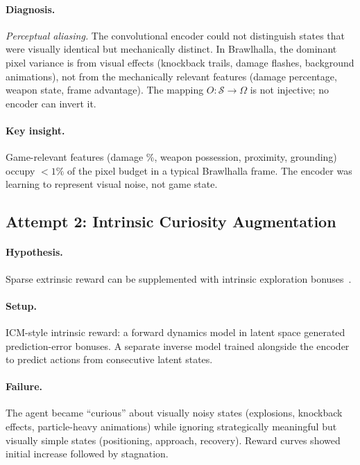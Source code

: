 \documentclass[11pt,a4paper]{article}
\begin{document}
\paragraph{Diagnosis.}
\emph{Perceptual aliasing.}
The convolutional encoder could not distinguish states that were visually identical but mechanically distinct.
In Brawlhalla, the dominant pixel variance is from visual effects (knockback trails, damage flashes, background animations), not from the mechanically relevant features (damage percentage, weapon state, frame advantage).
The mapping $O: \mathcal{S} \to \Omega$ is not injective; no encoder can invert it.

\paragraph{Key insight.}
Game-relevant features (damage \%, weapon possession, proximity, grounding) occupy $<1\%$ of the pixel budget in a typical Brawlhalla frame.
The encoder was learning to represent visual noise, not game state.

\subsection{Attempt 2: Intrinsic Curiosity Augmentation}
\label{sec:curiosity-failure}

\paragraph{Hypothesis.}
Sparse extrinsic reward can be supplemented with intrinsic exploration bonuses~\cite{pathak2017curiosity}.

\paragraph{Setup.}
ICM-style intrinsic reward: a forward dynamics model in latent space generated prediction-error bonuses.
A separate inverse model trained alongside the encoder to predict actions from consecutive latent states.

\paragraph{Failure.}
The agent became ``curious'' about visually noisy states (explosions, knockback effects, particle-heavy animations) while ignoring strategically meaningful but visually simple states (positioning, approach, recovery).
Reward curves showed initial increase followed by stagnation.
\end{document}
